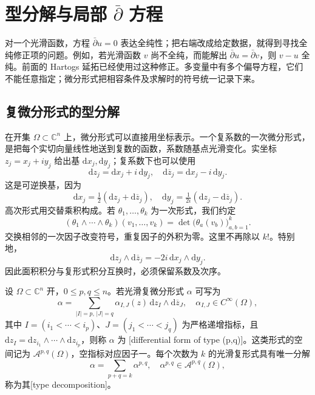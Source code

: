 \section{型分解与局部 \texorpdfstring{\(\bar\partial\)}{dbar} 方程}
\label{b3:sec:2905}

对一个光滑函数，方程 \(\bar\partial u=0\) 表达全纯性；把右端改成给定数据，就得到寻找全纯修正项的问题。例如，若光滑函数 \(v\) 尚不全纯，而能解出 \(\bar\partial u=\bar\partial v\)，则 \(v-u\) 全纯。前面的 Hartogs 延拓已经使用过这种修正。多变量中有多个偏导方程，它们不能任意指定；微分形式把相容条件及求解时的符号统一记录下来。

\subsection{复微分形式的型分解}
\label{b3:subsec:290501}

在开集 \(\Omega\subset\mathbb C^n\) 上，微分形式可以直接用坐标表示。一个复系数的一次微分形式，是把每个实切向量线性地送到复数的函数，系数随基点光滑变化。实坐标 \(z_j=x_j+iy_j\) 给出基 \(\mathrm dx_j,\mathrm dy_j\)；复系数下也可以使用
\[
 \mathrm dz_j=\mathrm dx_j+i\,\mathrm dy_j,\quad
 \mathrm d\overline z_j=\mathrm dx_j-i\,\mathrm dy_j.
\]
这是可逆换基，因为
\[
 \mathrm dx_j=\tfrac12(\mathrm dz_j+\mathrm d\overline z_j),\quad
 \mathrm dy_j=\tfrac1{2i}(\mathrm dz_j-\mathrm d\overline z_j).
\]
高次形式用交替乘积构成。若 \(\theta_1,\ldots,\theta_k\) 为一次形式，我们约定
\[
 (\theta_1\wedge\cdots\wedge\theta_k)(v_1,\ldots,v_k)
 =\det\bigl(\theta_a(v_b)\bigr)_{a,b=1}^k.
\]
交换相邻的一次因子改变符号，重复因子的外积为零。这里不再除以 \(k!\)。特别地，
\[
 \mathrm dz_j\wedge\mathrm d\overline z_j
 =-2i\,\mathrm dx_j\wedge\mathrm dy_j.
\]
因此面积积分与复形式积分互换时，必须保留系数及次序。

\begin{definition}\label{b3:def:29-form-type}
设 \(\Omega\subset\mathbb C^n\) 开，\(0\le p,q\le n\)。若光滑复微分形式 \(\alpha\) 可写为
\[
 \alpha=\sum_{|I|=p,\,|J|=q}\alpha_{I,J}(z)\,
       \mathrm dz_I\wedge\mathrm d\overline z_J,
 \quad \alpha_{I,J}\in C^\infty(\Omega),
\]
其中 \(I=(i_1<\cdots<i_p)\)、\(J=(j_1<\cdots<j_q)\) 为严格递增指标，且
\(\mathrm dz_I=\mathrm dz_{i_1}\wedge\cdots\wedge\mathrm dz_{i_p}\)，则称 \(\alpha\) 为 [differential form of type (p,q)]。这类形式的空间记为 \(\mathcal A^{p,q}(\Omega)\)，空指标对应因子一。每个次数为 \(k\) 的光滑复形式具有唯一分解
\[
 \alpha=\sum_{p+q=k}\alpha^{p,q},\quad
 \alpha^{p,q}\in\mathcal A^{p,q}(\Omega),
\]
称为其[type decomposition]。
\end{definition}

